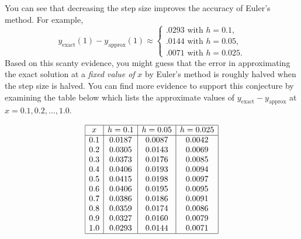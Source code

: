 \documentclass{ximera}
\begin{document}
\begin{example}
\begin{explanation}
You can see that decreasing the step size
improves the accuracy of Euler's method. For example,
$$
y_{\text{exact}}(1)-y_{\text{approx}}(1)\approx
\left\{\begin{array}{l}
.0293\text{ with }h=0.1,\\
.0144\text{ with }h=0.05,\\
.0071\text{ with }h=0.025.
\end{array}\right.
$$
Based on this scanty evidence, you might guess that the error in
approximating the exact solution at a \textit{fixed value of} $x$ by
Euler's method is roughly halved when the step size is halved. You can
find more evidence to support this conjecture by examining
the table below which lists the approximate values of
$y_{\text{exact}}-y_{\text{approx}}$ at
$x=0.1, 0.2, \dots, 1.0$.
 
$$
\begin{array}{|c|c|c|c|}
\hline
x & h=0.1 & h=0.05 & h=0.025\\ \hline
0.1 & 0.0187 & 0.0087 & 0.0042\\
0.2 & 0.0305 & 0.0143 & 0.0069\\
0.3 & 0.0373 & 0.0176 & 0.0085\\
0.4 & 0.0406 & 0.0193 & 0.0094\\
0.5 & 0.0415 & 0.0198 & 0.0097\\
0.6 & 0.0406 & 0.0195 & 0.0095\\
0.7 & 0.0386 & 0.0186 & 0.0091\\
0.8 & 0.0359 & 0.0174 & 0.0086\\
0.9 & 0.0327 & 0.0160 & 0.0079\\
1.0 & 0.0293 & 0.0144 & 0.0071\\
\hline
\end{array}
$$

\end{explanation}
\end{example}

\begin{center}
\end{center}
 
 
%
%
%
 
\end{document}
